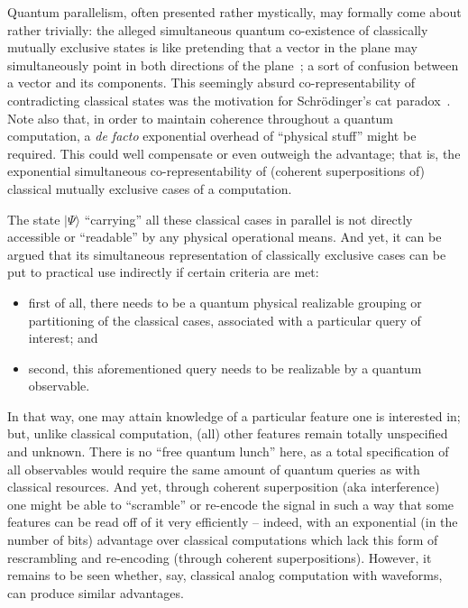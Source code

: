 \documentclass[runningheads]{llncs}
\begin{document}
Quantum parallelism, often presented rather mystically,
may formally come about rather trivially: the alleged simultaneous quantum co-existence of classically mutually exclusive states is like
pretending that a vector in the plane may simultaneously point in both directions of the plane~\cite{Dyakonov-2019};
a sort of confusion between a vector and its components.
This seemingly absurd co-representability of contradicting classical states was the motivation for Schr\"odinger's cat paradox~\cite{schrodinger}.
Note also that, in order to maintain coherence throughout a quantum computation,
a {\em de facto} exponential overhead of ``physical stuff'' might be required.
This could well compensate or even outweigh the advantage; that is, the exponential simultaneous
co-representability of (coherent superpositions of) classical mutually exclusive cases of a computation.

The state
$
\vert \Psi \rangle
$
``carrying'' all these classical cases in parallel is not directly accessible or ``readable'' by any physical operational means.
And yet, it can be argued that its simultaneous representation of classically exclusive cases can be put to practical use indirectly if certain criteria are met:
\begin{itemize}
\item
first of all, there needs to be a quantum physical realizable grouping or partitioning of the
classical cases, associated with a particular query of interest; and
\item
second, this aforementioned query needs to be realizable by a quantum observable.
\end{itemize}
In that way, one may attain knowledge of a particular feature one is interested in; but,
unlike classical computation, (all) other features remain totally unspecified and unknown.
There is no ``free quantum lunch'' here, as a total specification of all observables would
require the same amount of quantum queries as with classical resources.
And yet, through coherent superposition (aka interference)
one might be able to ``scramble'' or re-encode the signal
in such a way that some features can be read off of it very efficiently --
indeed, with an exponential (in the number of bits) advantage over classical computations
which lack this form of rescrambling and re-encoding (through coherent superpositions).
However, it remains to be seen whether, say, classical analog computation with waveforms,
can produce similar advantages.
\end{document}
